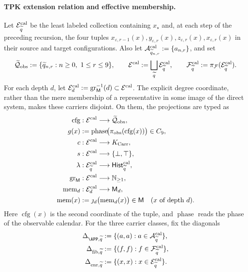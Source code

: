 \paragraph{TPK extension relation and effective membership.}
Let \(\mathcal E^{\rm cal}_{\widetilde q}\) be the least labeled collection
containing \(x_\star\) and, at each step of the preceding recursion, the four
tuples
\(x_{\varepsilon,r-1}(x),y_{\varepsilon,r}(x),
z_{\varepsilon,r}(x),x_{\varepsilon,r}(x)\) in their source and target
configurations. Also let
\(\mathcal A^{\rm cal}_{\widetilde q_{n,r}}:=\{a_{n,r}\}\), and set
\[
 \widetilde{\mathcal Q}_{\rm obs}:=
   \{\widetilde q_{n,r}:n\ge0,\ 1\le r\le9\},
 \qquad
 \mathcal E^{\rm cal}:=\bigsqcup_{\widetilde q}
     \mathcal E^{\rm cal}_{\widetilde q},
 \qquad
 \mathcal F^{\rm cal}_{\widetilde q}:=
     \pi_{\mathcal F}(\mathcal E^{\rm cal}_{\widetilde q}).
\]
For each depth \(d\), let
\(\mathcal E^{\rm cal}_d:=
\operatorname{gr}_{\mathsf M}^{-1}(d)\subset\mathcal E^{\rm cal}\). The
explicit degree coordinate, rather than the mere membership of a
representative in some image of the direct system, makes these carriers
disjoint. On them, the projections are typed as
\[
\begin{aligned}
 \operatorname{cfg}&:\mathcal E^{\rm cal}\longrightarrow
     \widetilde{\mathcal Q}_{\rm obs},\\
 g(x)&:=\operatorname{phase}\!
       \bigl(\pi_{\rm obs}(\operatorname{cfg}(x))\bigr)\in C_9,\\
 c&:\mathcal E^{\rm cal}\longrightarrow K_{\rm Carr},\\
 s&:\mathcal E^{\rm cal}\longrightarrow\{\bot,\top\},\\
 \lambda&:\mathcal E^{\rm cal}_{\widetilde q}
       \longrightarrow\mathsf{Hist}^{\rm cal}_{\widetilde q},\\
 \operatorname{gr}_{\mathsf M}&:\mathcal E^{\rm cal}
       \longrightarrow\mathbb N_{\ge1},\\
 \operatorname{mem}_d&:\mathcal E^{\rm cal}_d
       \longrightarrow\mathsf M_d,\\
 \operatorname{mem}(x)&:=
       \jmath_d\bigl(\operatorname{mem}_d(x)\bigr)\in\mathsf M
       \quad(x\text{ of depth }d).
\end{aligned}
\]
Here \(\operatorname{cfg}(x)\) is the second coordinate of the tuple, and
\(\operatorname{phase}\) reads the phase of the observable calendar. For the
three carrier classes, fix the diagonals
\[
\begin{aligned}
 \Delta_{\APP,\widetilde q}
   &:=\{(a,a):a\in\mathcal A^{\rm cal}_{\widetilde q}\},\\
 \Delta_{{\rm fib},\widetilde q}
   &:=\{(f,f):f\in\mathcal F^{\rm cal}_{\widetilde q}\},\\
 \Delta_{{\rm enr},\widetilde q}
   &:=\{(x,x):x\in\mathcal E^{\rm cal}_{\widetilde q}\}.
\end{aligned}
\]

